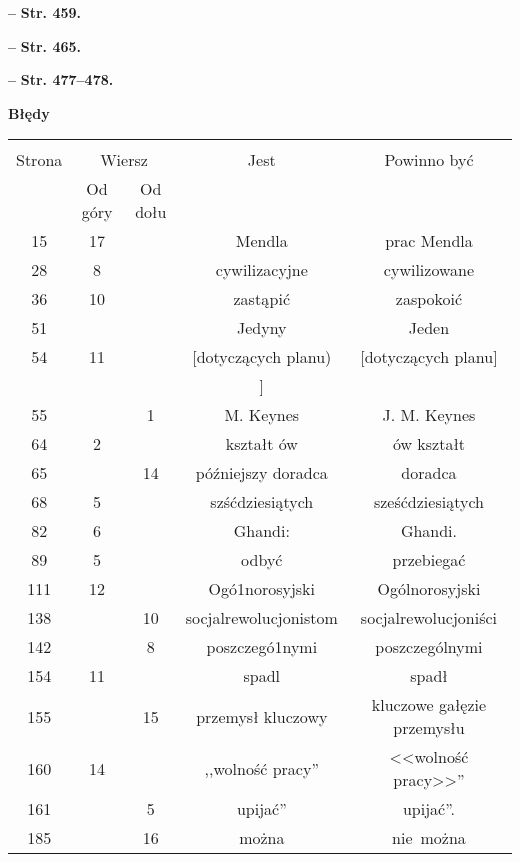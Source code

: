 \documentclass[a4paper,11pt]{article}  %
\newcommand{\spaceFour}{0.5em}
\newcommand{\tb}{\textbf}
\newcommand{\noi}{\noindent}
\newcommand{\start}{\noi \tb{--} {}}
\newcommand{\Str}[1]{\tb{Str. #1.}}
\newcommand{\Center}[1]{\begin{center} #1 \end{center}}
\newcommand{\CenterTB}[1]{\Center{\tb{#1}}}
\begin{document}
\vspace{\spaceFour}


\start \Str{459}

\vspace{\spaceFour}


\start \Str{465}

\vspace{\spaceFour}


\start \Str{477--478}

\newpage
\CenterTB{Błędy}
\begin{center}
  \begin{tabular}{|c|c|c|c|c|}
    \hline
    & \multicolumn{2}{c|}{} & & \\
    Strona & \multicolumn{2}{c|}{Wiersz}& Jest & Powinno być \\ \cline{2-3}
    & Od góry & Od dołu & & \\ \hline
    15  & 17 & & Mendla & prac Mendla \\
    28  &  8 & & cywilizacyjne & cywilizowane \\
    36  & 10 & & zastąpić & zaspokoić \\
    51  & & & Jedyny & Jeden \\ %
    54  & 11 & & [dotyczących planu) & [dotyczących planu] \\
    & & & ] & \\
    55  & &  1 & M. Keynes & J. M. Keynes \\
    64  &  2 & & kształt ów & ów kształt \\
    65  & & 14 & późniejszy doradca & doradca \\
    68  &  5 & & szśćdziesiątych & sześćdziesiątych \\
    82  &  6 & & Ghandi: & Ghandi. \\
    89  &  5 & & odbyć & przebiegać \\
    111 & 12 & & Ogó1norosyjski & Ogólnorosyjski \\
    138 & & 10 & socjalrewolucjonistom & socjalrewolucjoniści \\
    142 & &  8 & poszczegó1nymi & poszczególnymi \\
    154 & 11 & & spadl & spadł \\
    155 & & 15 & przemysł kluczowy & kluczowe gałęzie przemysłu \\
    160 & 14 & & ,,wolność pracy'' & <<wolność pracy>>'' \\
    161 & &  5 & upijać'' & upijać''. \\
    185 & & 16 & można & nie~można \\

\end{tabular}
\end{center}
\end{document}
